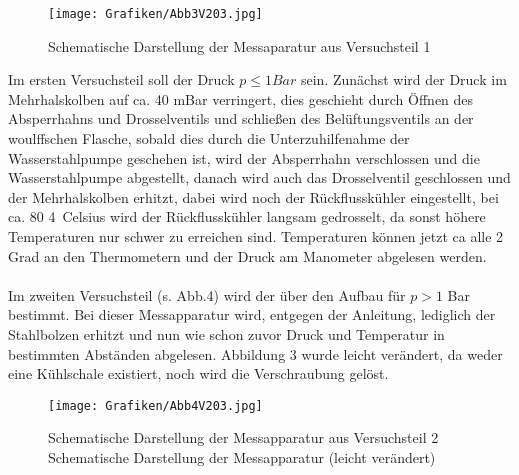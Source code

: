 \begin{wrapfigure}[16]{r}{0.4\textwidth}
        \texttt{[image: Grafiken/Abb3V203.jpg]}
        \caption{Schematische Darstellung der Messaparatur aus Versuchsteil 1}
        \label{fig:Abb3}
\end{wrapfigure}
Im ersten Versuchsteil soll der Druck $p \leq 1 Bar$ sein.
Zunächst wird der Druck im Mehrhalskolben auf ca. 40 mBar verringert, 
dies geschieht durch Öffnen des Absperrhahns und Drosselventils und schließen des Belüftungsventils 
an der woulffschen Flasche, sobald dies durch die Unterzuhilfenahme der Wasserstahlpumpe geschehen ist, 
wird der Absperrhahn verschlossen und die Wasserstahlpumpe abgestellt, danach wird auch das Drosselventil geschlossen 
und der Mehrhalskolben erhitzt, dabei wird noch der Rückflusskühler eingestellt, bei ca. 80 \SI{4}{Celsius} wird
der Rückflusskühler langsam gedrosselt, da sonst höhere Temperaturen nur schwer zu erreichen sind.
Temperaturen können jetzt ca alle 2 Grad an den Thermometern und der Druck am Manometer abgelesen werden. \\


\\ Im zweiten Versuchsteil (s. Abb.4) wird der über den Aufbau für 
$p > 1$ Bar bestimmt.
Bei dieser Messapparatur wird, entgegen der Anleitung, lediglich der Stahlbolzen erhitzt und nun wie schon zuvor Druck und Temperatur in bestimmten Abständen abgelesen.
Abbildung 3 wurde leicht verändert, da weder eine Kühlschale existiert, noch wird die Verschraubung gelöst. 
\begin{wrapfigure}[16]{r}{0.7\textwidth}
        \texttt{[image: Grafiken/Abb4V203.jpg]}
        \caption{Schematische Darstellung der Messapparatur aus Versuchsteil 2 Schematische Darstellung der Messapparatur (leicht verändert)}
        \label{fig:Abb4}
\end{wrapfigure}
